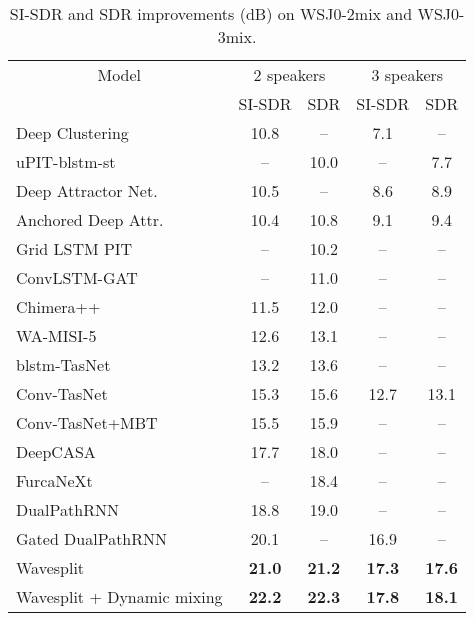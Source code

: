 \documentclass[letterpaper, onecolumn,10 pt]{IEEEtran}
\begin{document}
\begin{table*}[t]
        \small
        \centering
        \caption{SI-SDR and SDR improvements (dB) on WSJ0-2mix and WSJ0-3mix.}
        \vspace{0.2cm}
        \label{table:wsj0_2_3mix_improv}
        \begin{tabular}{l|c|c|c|c}
                \hline\hline
                \multicolumn{1}{c|}{Model} & \multicolumn{2}{c|}{2 speakers} & \multicolumn{2}{c}{3 speakers} \\
                \multicolumn{1}{c|}{} & SI-SDR & SDR  & SI-SDR & SDR  \\
                \hline\hline
                Deep Clustering \cite{isik16:deep_clustering}            & 10.8 & -- & 7.1 & -- \\
                uPIT-blstm-st \cite{kolbaek17:multitalker}               &  --  & 10.0 & -- & 7.7 \\
                Deep Attractor Net. \cite{chen17:deep_attractor}         & 10.5 & -- & 8.6 & 8.9  \\
                Anchored Deep Attr. \cite{luo18:deep_attractor}          & 10.4 & 10.8 & 9.1 & 9.4 \\
                Grid LSTM PIT \cite{xu18:pit}                            &  --  & 10.2 & -- & --  \\
                ConvLSTM-GAT \cite{li18:cbldnn}                          &  --  & 11.0 & -- & --  \\
                Chimera++ \cite{wang18:deep_clustering_objectives}       & 11.5 & 12.0 & -- & --  \\
                WA-MISI-5 \cite{wang18:unfolded}                         & 12.6 & 13.1 & -- & --  \\
                blstm-TasNet \cite{luo18:tasnet}                         & 13.2 & 13.6 & -- & --  \\
                Conv-TasNet \cite{luo19:tasnet}                          & 15.3 & 15.6 & 12.7 & 13.1 \\
                Conv-TasNet+MBT \cite{lam19:mixupbreakdown}              & 15.5 & 15.9 & -- & --  \\
                DeepCASA \cite{liu19:deepcasa}                           & 17.7 & 18.0 & -- & -- \\
                FurcaNeXt \cite{zhang2020:furcanext}                     &  --  & 18.4 & -- & -- \\
                DualPathRNN \cite{luo2019:dualpathrnn}                   & 18.8 & 19.0 & -- & -- \\
                Gated DualPathRNN \cite{nachmani2020voice}               & 20.1 & -- & 16.9 & --  \\           
                \hline
                Wavesplit                                                &\bf{21.0}&\bf{21.2} & \bf{17.3} & \bf{17.6} \\
                Wavesplit + Dynamic mixing                               &\bf{22.2}&\bf{22.3} & \bf{17.8} & \bf{18.1} \\
                \hline                
        \end{tabular}
\end{table*}
\end{document}

